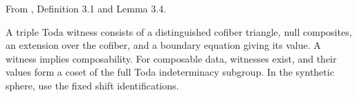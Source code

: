 \begin{definition}
\label{sem:Literature:toda-relations}
From \cite{ChristensenFrankland2017}, Definition 3.1 and Lemma 3.4.\par

A triple Toda witness consists of a distinguished cofiber triangle, null composites, an extension over the cofiber, and a boundary equation giving its value. A witness implies composability. For composable data, witnesses exist, and their values form a coset of the full Toda indeterminacy subgroup. In the synthetic sphere, use the fixed shift identifications.
\end{definition}

